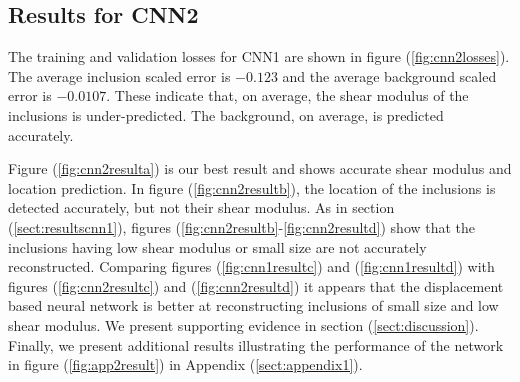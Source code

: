\documentclass[12pt]{article}
\begin{document}
\subsection{\label{sect:resultscnn2}Results for CNN2}
The training and validation losses for CNN1 are shown in figure (\ref{fig:cnn2losses}). The average inclusion scaled error is $-0.123$ and the average background scaled error is $-0.0107$. These indicate that, on average, the shear modulus of the inclusions is under-predicted. The background, on average, is predicted accurately.

Figure (\ref{fig:cnn2resulta}) is our best result and shows accurate shear modulus and location prediction. In figure (\ref{fig:cnn2resultb}), the location of the inclusions is detected accurately, but not their shear modulus. As in section (\ref{sect:resultscnn1}), figures (\ref{fig:cnn2resultb}-\ref{fig:cnn2resultd}) show that the inclusions having low shear modulus or small size are not accurately reconstructed. Comparing figures (\ref{fig:cnn1resultc}) and (\ref{fig:cnn1resultd}) with figures (\ref{fig:cnn2resultc}) and (\ref{fig:cnn2resultd}) it appears that the displacement based neural network is better at reconstructing inclusions of small size and low shear modulus. We present supporting evidence in section (\ref{sect:discussion}). Finally, we present additional results illustrating the performance of the network in figure (\ref{fig:app2result}) in Appendix (\ref{sect:appendix1}).
\end{document}
